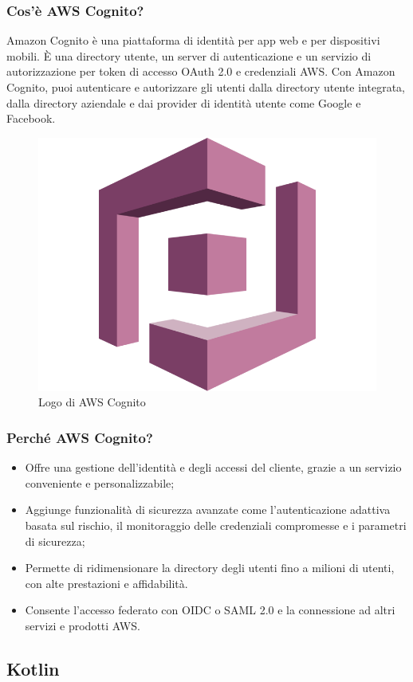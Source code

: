             \subsubsection{Cos'è AWS Cognito? \cite{AWS4}} 
                Amazon Cognito è una piattaforma di identità per app web e per dispositivi mobili. È una directory utente, un server di autenticazione e un servizio di autorizzazione per token di accesso OAuth 2.0 e credenziali AWS. Con Amazon Cognito, puoi autenticare e autorizzare gli utenti dalla directory utente integrata, dalla directory aziendale e dai provider di identità utente come Google e Facebook.
            \begin{figure}[htbp!]
                \centering
                \includegraphics[width=0.2\linewidth]{Immagini/System Design/AWS Cognito.png}
                \caption{Logo di AWS Cognito}
            \end{figure}
            \subsubsection{Perché AWS Cognito? \cite{AWS5}}
            \begin{itemize}
                \item Offre una gestione dell'identità e degli accessi del cliente, grazie a un servizio conveniente e personalizzabile;
                \item Aggiunge funzionalità di sicurezza avanzate come l'autenticazione adattiva basata sul rischio, il monitoraggio delle credenziali compromesse e i parametri di sicurezza;
                \item Permette di ridimensionare la directory degli utenti fino a milioni di utenti, con alte prestazioni e affidabilità.
                \item Consente l'accesso federato con OIDC o SAML 2.0 e la connessione ad altri servizi e prodotti AWS.
            \end{itemize}
           
        \subsection{Kotlin}

